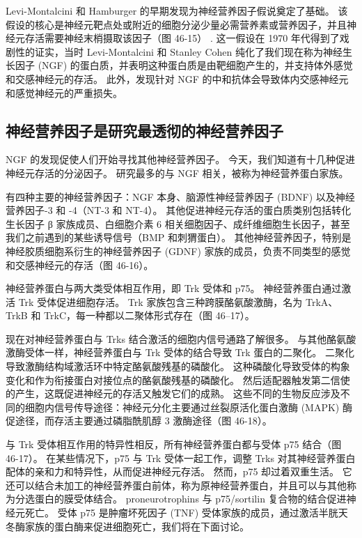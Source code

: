 Levi-Montalcini 和 Hamburger 的早期发现为神经营养因子假说奠定了基础。 该假设的核心是神经元靶点处或附近的细胞分泌少量必需营养素或营养因子，并且神经元存活需要神经末梢摄取该因子（图 46-15） . 这一假设在 1970 年代得到了戏剧性的证实，当时 Levi-Montalcini 和 Stanley Cohen 纯化了我们现在称为神经生长因子 (NGF) 的蛋白质，并表明这种蛋白质是由靶细胞产生的，并支持体外感觉和交感神经元的存活。 此外，发现针对 NGF 的中和抗体会导致体内交感神经元和感觉神经元的严重损失。

\subsection{神经营养因子是研究最透彻的神经营养因子}
NGF 的发现促使人们开始寻找其他神经营养因子。 今天，我们知道有十几种促进神经元存活的分泌因子。 研究最多的与 NGF 相关，被称为神经营养蛋白家族。

有四种主要的神经营养因子：NGF 本身、脑源性神经营养因子 (BDNF) 以及神经营养因子-3 和 -4（NT-3 和 NT-4）。 其他促进神经元存活的蛋白质类别包括转化生长因子 β 家族成员、白细胞介素 6 相关细胞因子、成纤维细胞生长因子，甚至我们之前遇到的某些诱导信号（BMP 和刺猬蛋白）。 其他神经营养因子，特别是神经胶质细胞系衍生的神经营养因子 (GDNF) 家族的成员，负责不同类型的感觉和交感神经元的存活（图 46-16）。

神经营养蛋白与两大类受体相互作用，即 Trk 受体和 p75。 神经营养蛋白通过激活 Trk 受体促进细胞存活。 Trk 家族包含三种跨膜酪氨酸激酶，名为 TrkA、TrkB 和 TrkC，每一种都以二聚体形式存在（图 46–17）。

现在对神经营养蛋白与 Trks 结合激活的细胞内信号通路了解很多。 与其他酪氨酸激酶受体一样，神经营养蛋白与 Trk 受体的结合导致 Trk 蛋白的二聚化。 二聚化导致激酶结构域激活环中特定酪氨酸残基的磷酸化。 这种磷酸化导致受体的构象变化和作为衔接蛋白对接位点的酪氨酸残基的磷酸化。 然后适配器触发第二信使的产生，这既促进神经元的存活又触发它们的成熟。 这些不同的生物反应涉及不同的细胞内信号传导途径：神经元分化主要通过丝裂原活化蛋白激酶 (MAPK) 酶促途径，而存活主要通过磷脂酰肌醇 3 激酶途径（图 46-18）。

与 Trk 受体相互作用的特异性相反，所有神经营养蛋白都与受体 p75 结合（图 46-17）。 在某些情况下，p75 与 Trk 受体一起工作，调整 Trks 对其神经营养蛋白配体的亲和力和特异性，从而促进神经元存活。 然而，p75 却过着双重生活。 它还可以结合未加工的神经营养蛋白前体，称为原神经营养蛋白，并且可以与其他称为分选蛋白的膜受体结合。 proneurotrophins 与 p75/sortilin 复合物的结合促进神经元死亡。 受体 p75 是肿瘤坏死因子 (TNF) 受体家族的成员，通过激活半胱天冬酶家族的蛋白酶来促进细胞死亡，我们将在下面讨论。

